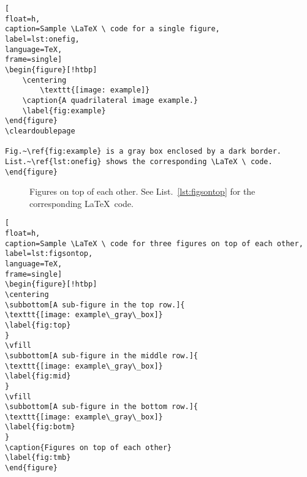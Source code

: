 \begin{lstlisting}[
float=h,
caption=Sample \LaTeX \ code for a single figure, 
label=lst:onefig,
language=TeX,
frame=single]
\begin{figure}[!htbp]
	\centering
		\texttt{[image: example]}
	\caption{A quadrilateral image example.}
	\label{fig:example}
\end{figure}
\cleardoublepage

Fig.~\ref{fig:example} is a gray box enclosed by a dark border. List.~\ref{lst:onefig} shows the corresponding \LaTeX \ code. 	
\end{figure}
\end{lstlisting}
\cleardoublepage





\begin{figure}[!htbp]
	\centering
	\vfill
	\vfill
	\caption{Figures on top of each other. See List.~\ref{lst:figsontop} for the corresponding \LaTeX \ code. }
	\label{fig:tmb}
\end{figure}
\cleardoublepage




\begin{lstlisting}[
float=h,
caption=Sample \LaTeX \ code for three figures on top of each other, 
label=lst:figsontop,
language=TeX,
frame=single]
\begin{figure}[!htbp]
\centering
\subbottom[A sub-figure in the top row.]{
\texttt{[image: example\_gray\_box]}
\label{fig:top}
}
\vfill
\subbottom[A sub-figure in the middle row.]{
\texttt{[image: example\_gray\_box]}
\label{fig:mid}
}
\vfill
\subbottom[A sub-figure in the bottom row.]{
\texttt{[image: example\_gray\_box]}
\label{fig:botm}
}
\caption{Figures on top of each other} 
\label{fig:tmb}
\end{figure}
\end{lstlisting}
\cleardoublepage







